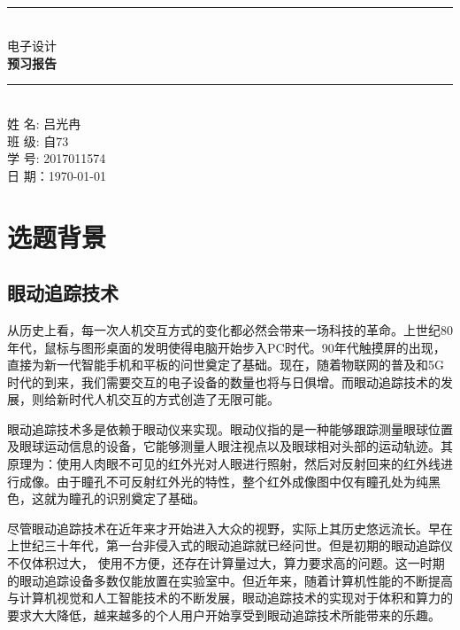 \documentclass{article}
\begin{document}
\begin{spacing}{1.5}

    \thispagestyle{empty}
    \begin{center}
~\\[6cm]\rule{\linewidth}{0.5mm} \\[6mm]
{\Large 电子设计  \\  \textbf{{\LARGE 预习报告}}  \\[6mm]}
\rule{\linewidth}{0.5mm} \\[2cm]
{\Large 姓 名: 吕光冉}\\[.3cm]
{\Large 班 级:   自73 }\\[.3cm]
{\Large 学 号:  2017011574}\\[.3cm]
{\Large 日 期：\today }\\[.3cm]
    \end{center}

    \clearpage
    \phantom{s}

     \tableofcontents
     \newpage

\section{选题背景}

    \subsection{眼动追踪技术}
 
从历史上看，每一次人机交互方式的变化都必然会带来一场科技的革命。上世纪80年代，鼠标与图形桌面的发明使得电脑开始步入PC时代。90年代触摸屏的出现，直接为新一代智能手机和平板的问世奠定了基础。现在，随着物联网的普及和5G时代的到来，我们需要交互的电子设备的数量也将与日俱增。而眼动追踪技术的发展，则给新时代人机交互的方式创造了无限可能。

​眼动追踪技术多是依赖于眼动仪来实现。眼动仪指的是一种能够跟踪测量眼球位置及眼球运动信息的设备，它能够测量人眼注视点以及眼球相对头部的运动轨迹。其原理为：使用人肉眼不可见的红外光对人眼进行照射，然后对反射回来的红外线进行成像。由于瞳孔不可反射红外光的特性，整个红外成像图中仅有瞳孔处为纯黑色，这就为瞳孔的识别奠定了基础。

​尽管眼动追踪技术在近年来才开始进入大众的视野，实际上其历史悠远流长。早在上世纪三十年代，第一台非侵入式的眼动追踪就已经问世。但是初期的眼动追踪仪不仅体积过大，
使用不方便，还存在计算量过大，算力要求高的问题。这一时期的眼动追踪设备多数仅能放置在实验室中。但近年来，随着计算机性能的不断提高与计算机视觉和人工智能技术的不断发展，眼动追踪技术的实现对于体积和算力的要求大大降低，越来越多的个人用户开始享受到眼动追踪技术所能带来的乐趣。


\end{spacing}
\end{document}
